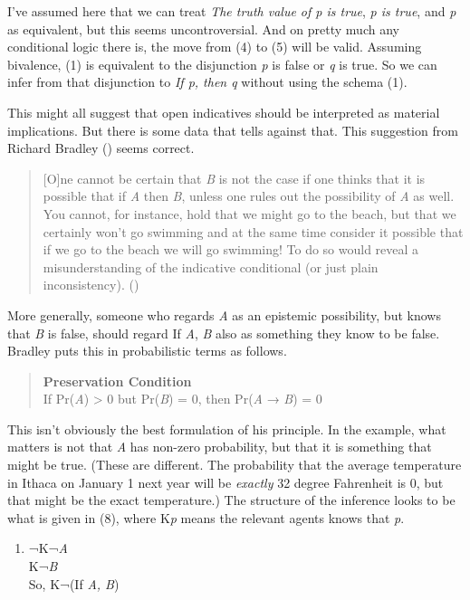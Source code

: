 \documentclass[
  10pt,
  letterpaper,
  DIV=11,
  numbers=noendperiod,
  twoside]{scrartcl}
\providecommand{\tightlist}{%
  \setlength{\itemsep}{0pt}\setlength{\parskip}{0pt}}\usepackage{longtable,booktabs,array}
\begin{document}
I've assumed here that we can treat \emph{The truth value of p is true},
\emph{p is true}, and \emph{p} as equivalent, but this seems
uncontroversial. And on pretty much any conditional logic there is, the
move from (4) to (5) will be valid. Assuming bivalence, (1) is
equivalent to the disjunction \emph{p} is false or \emph{q} is true. So
we can infer from that disjunction to \emph{If p, then q} without using
the schema (1).

This might all suggest that open indicatives should be interpreted as
material implications. But there is some data that tells against that.
This suggestion from Richard Bradley ()
seems correct.

\begin{quote}
{[}O{]}ne cannot be certain that \emph{B} is not the case if one thinks
that it is possible that if \emph{A} then \emph{B}, unless one rules out
the possibility of \emph{A} as well. You cannot, for instance, hold that
we might go to the beach, but that we certainly won't go swimming and at
the same time consider it possible that if we go to the beach we will go
swimming! To do so would reveal a misunderstanding of the indicative
conditional (or just plain inconsistency).
()
\end{quote}

More generally, someone who regards \emph{A} as an epistemic
possibility, but knows that \emph{B} is false, should regard If
\emph{A}, \emph{B} also as something they know to be false. Bradley puts
this in probabilistic terms as follows.

\begin{quote}
\textbf{Preservation Condition}\\
If Pr(\emph{A}) \textgreater{} 0 but Pr(\emph{B}) = 0, then Pr(\emph{A}
→ \emph{B}) = 0
\end{quote}

This isn't obviously the best formulation of his principle. In the
example, what matters is not that \emph{A} has non-zero probability, but
that it is something that might be true. (These are different. The
probability that the average temperature in Ithaca on January 1 next
year will be \emph{exactly} 32 degree Fahrenheit is 0, but that might be
the exact temperature.) The structure of the inference looks to be what
is given in (8), where K\emph{p} means the relevant agents knows that
\emph{p}.

\begin{enumerate}
\def\labelenumi{\arabic{enumi}.}
\setcounter{enumi}{7}
\tightlist
\item
  ¬K¬\emph{A}\\
  K¬\emph{B}\\
  So, K¬(If \emph{A, B})
\end{enumerate}
\end{document}
